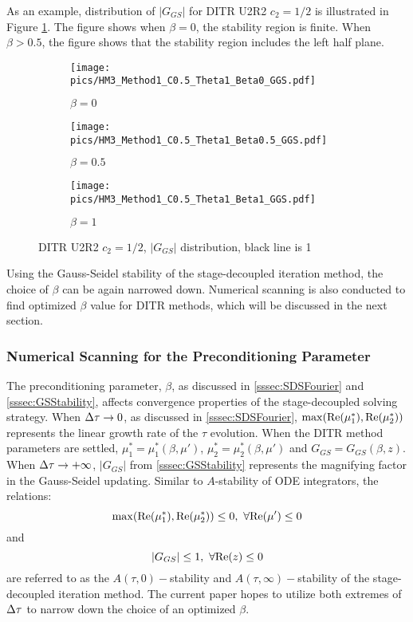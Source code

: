 As an example, distribution of $|G_{GS}|$ for DITR U2R2 $c_2=1/2$
is illustrated in Figure \ref{fig:GGSU2R2}.
The figure shows when $\beta=0$, the stability region is finite.
When $\beta>0.5$, the figure shows that the stability region includes
the left half plane.
\begin{figure}[htbp]
    \centering
    \begin{subfigure}{0.33\textwidth}
        \texttt{[image: pics/HM3\_Method1\_C0.5\_Theta1\_Beta0\_GGS.pdf]}
        \caption[]{$\beta = 0$}
    \end{subfigure}\hfill
    \begin{subfigure}{0.33\textwidth}
        \texttt{[image: pics/HM3\_Method1\_C0.5\_Theta1\_Beta0.5\_GGS.pdf]}
        \caption[]{$\beta = 0.5$}
    \end{subfigure}\hfill
    \begin{subfigure}{0.33\textwidth}
        \texttt{[image: pics/HM3\_Method1\_C0.5\_Theta1\_Beta1\_GGS.pdf]}
        \caption[]{$\beta = 1$}
    \end{subfigure}
    \caption{DITR U2R2 $c_2=1/2$, $|G_{GS}|$ distribution, black line is 1}
    \label{fig:GGSU2R2}
\end{figure}

Using the Gauss-Seidel stability of the stage-decoupled iteration method,
the choice of $\beta$ can be again narrowed down.
Numerical scanning is also conducted to find optimized $\beta$ value for
DITR methods, which will be discussed in the next section.

\subsubsection{Numerical Scanning for the Preconditioning Parameter}
\label{sssec:numScan}

The preconditioning parameter, $\beta$, as discussed in \ref{sssec:SDSFourier}
and \ref{sssec:GSStability}, affects convergence properties of the
stage-decoupled solving strategy.
When ${\Delta} \tau\rightarrow0$, as discussed in \ref{sssec:SDSFourier},
$\max(\mathrm{Re}(\mu^*_1),\mathrm{Re}(\mu^*_2))$ represents the linear growth
rate of the $\tau$ evolution. When the DITR method parameters are settled,
$\mu^*_1=\mu^*_1(\beta, \mu')$, $\mu^*_2=\mu^*_2(\beta, \mu')$ and $G_{GS}=G_{GS}(\beta, z)$.
When ${\Delta} \tau\rightarrow+\infty$, $|G_{GS}|$ from \ref{sssec:GSStability}
represents the magnifying factor in the Gauss-Seidel updating.
Similar to $A$-stability of ODE integrators,
the relations:
\begin{equation}
    \max(\real(\mu^*_1),\real(\mu^*_2)) \leq 0,\ \forall \real(\mu') \leq 0
\end{equation}
and
\begin{equation}
    |G_{GS}| \leq 1,\ \forall \mathrm{Re}(z) \leq 0
\end{equation}
are referred to as the $A(\tau,0)-$stability and
$A(\tau,\infty)-$stability
of the stage-decoupled iteration method.
The current paper hopes to utilize both extremes of ${\Delta}\tau$ to
narrow down the choice of an optimized $\beta$.



